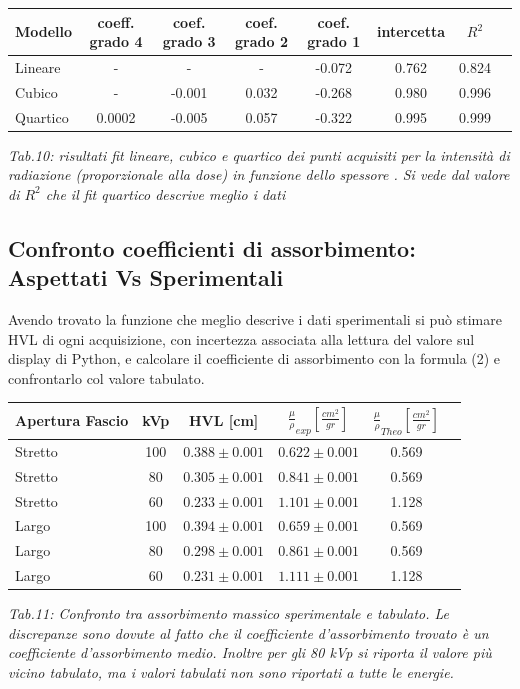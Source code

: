 \documentclass[a4paper]{article}
\begin{document}
\begin{center} 
		
		\begin{tabular}{lccccccc}
			\hline
			\hline
			\textbf{Modello}	& \textbf{coeff. grado 4}&\textbf{coef. grado 3}&\textbf{coef. grado 2}& \textbf{coef. grado 1}& \textbf{intercetta}&  \textbf{$R^{2}$} 	 \\
			\hline
			\hline
			Lineare	&-&-&-&-0.072&0.762&0.824	\\
			Cubico	&-&-0.001&0.032&-0.268&0.980&0.996\\
			Quartico &0.0002&-0.005&0.057&-0.322&0.995&0.999\\
			
			\hline
			\hline
		\end{tabular}
		\linebreak
		\emph{Tab.10: risultati fit lineare, cubico e quartico  dei punti acquisiti per la intensità di radiazione (proporzionale alla dose) in funzione dello spessore . Si vede dal valore di $R^{2}$ che il fit quartico descrive meglio i dati} 
	\end{center} 
\subsection{Confronto coefficienti di assorbimento: Aspettati Vs Sperimentali }
Avendo trovato la funzione che meglio descrive i dati sperimentali si può stimare HVL di ogni acquisizione, con incertezza associata alla lettura del valore sul display di Python, e calcolare il coefficiente di assorbimento con la formula (2) e confrontarlo col valore tabulato.
\begin{center} 
		
		\begin{tabular}{lccccc}
			\hline
			\hline
			\textbf{Apertura Fascio} &\textbf{kVp}	& \textbf{HVL [cm]}&\textbf{$\frac{\mu}{\rho}_{exp}[\frac{cm^{2}}{gr}]$}&\textbf{$\frac{\mu}{\rho}_{Theo}[\frac{cm^{2}}{gr}]$} 	 \\
			\hline
			\hline
			Stretto	& 100 &	$0.388 \pm 0.001$ &$0.622 \pm 0.001$&0.569 \\
			Stretto	& 80 &	$0.305 \pm 0.001$ &$0.841 \pm 0.001$&0.569 \\
			Stretto	& 60 &	$0.233 \pm 0.001$ &$1.101 \pm 0.001$&1.128 \\
			Largo	& 100 &	$0.394 \pm 0.001$ &$0.659 \pm 0.001$&0.569 \\
			Largo	& 80 &	$0.298 \pm 0.001$ &$0.861 \pm 0.001$&0.569 \\
			Largo	& 60 &	$0.231 \pm 0.001$ &$1.111 \pm 0.001$&1.128 \\
			
			
			\hline
			\hline
		\end{tabular}
		\linebreak
		\emph{Tab.11: Confronto tra assorbimento massico sperimentale e tabulato. Le discrepanze sono dovute al fatto che il coefficiente d'assorbimento trovato è un coefficiente d'assorbimento medio. Inoltre per gli 80 kVp si riporta il valore più vicino tabulato, ma i valori tabulati non sono riportati a tutte le energie.} 
\end{center}
\end{document}
